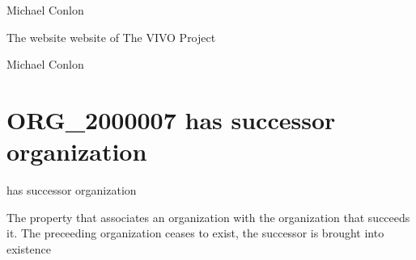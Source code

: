 \documentclass[letterpaper,10pt,english]{sphinxmanual}
\begin{document}
\begin{sphinxShadowBox}

\sphinxAtStartPar
Michael Conlon 
\end{sphinxShadowBox}

\begin{sphinxShadowBox}

\sphinxAtStartPar
The website  website of The VIVO Project
\end{sphinxShadowBox}

\begin{sphinxShadowBox}

\sphinxAtStartPar
Michael Conlon 
\end{sphinxShadowBox}
\begin{quote}
\label{\detokenize{doc-ORG_2000007:org-2000007}}\label{\detokenize{doc-ORG_2000007:has-successor-organization}}\label{\detokenize{doc-ORG_2000007:org-2000007}}
\ignorespaces \end{quote}


\section{ORG\_2000007 \sphinxhyphen{} has successor organization}
\label{\detokenize{doc-ORG_2000007:org-2000007-has-successor-organization}}\label{\detokenize{doc-ORG_2000007:index-0}}\label{\detokenize{doc-ORG_2000007::doc}}
\begin{sphinxShadowBox}

\sphinxAtStartPar
has successor organization
\end{sphinxShadowBox}

\begin{sphinxShadowBox}

\sphinxAtStartPar
The property that associates an organization with the organization that succeeds it.  The preceeding organization ceases to exist, the successor is brought into existence
\end{sphinxShadowBox}
\end{document}
